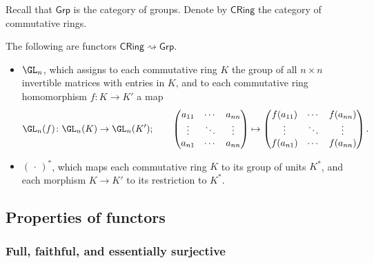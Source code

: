 \documentclass[notes.tex]{subfiles}
\begin{document}
\begin{example}
  \label{eg:twofunctorsgrptocring}
  Recall that $\mathsf{Grp}$ is the category of groups. Denote by $\mathsf{CRing}$ the category of commutative rings.

  The following are functors $\mathsf{CRing} \rightsquigarrow \mathsf{Grp}$.
  \begin{itemize}
    \item $\GL_{n}$, which assigns to each commutative ring $K$ the group of all $n \times n$ invertible matrices with entries in $K$, and to each commutative ring homomorphism $f\colon K \to K'$ a map
      \begin{equation*}
        \GL_{n}(f)\colon \GL_{n}(K) \to \GL_{n}(K');\qquad
        \begin{pmatrix}
          a_{11} & \cdots & a_{nn} \\
          \vdots & \ddots & \vdots \\
          a_{n1} & \cdots & a_{nn}
        \end{pmatrix}
        \mapsto
        \begin{pmatrix}
          f(a_{11}) & \cdots & f(a_{nn}) \\
          \vdots & \ddots & \vdots \\
          f(a_{n1}) & \cdots & f(a_{nn})
        \end{pmatrix}.
      \end{equation*}

    \item ${(\,\cdot\,)}^{*}$, which maps each commutative ring $K$ to its group of units $K^{*}$, and each morphism $K \to K'$ to its restriction to $K^{*}$.
  \end{itemize}
\end{example}

\subsection{Properties of functors}

\subsubsection{Full, faithful, and essentially surjective}
\end{document}
